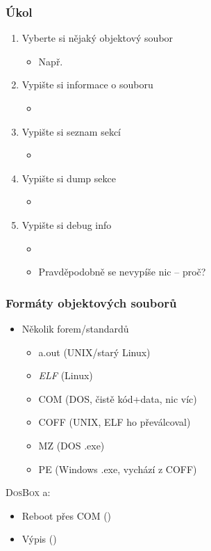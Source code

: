 \begin{frame}
  \frametitle{Úkol}

  \begin{enumerate}
    \item Vyberte si nějaký objektový soubor
    \begin{itemize}
      \item Např.\ 
    \end{itemize}
    \item Vypište si informace o souboru
    \begin{itemize}
      \item {}
    \end{itemize}
    \item Vypište si seznam sekcí
    \begin{itemize}
      \item {}
    \end{itemize}
    \item Vypište si dump sekce 
    \begin{itemize}
      \item {}
    \end{itemize}
    \item Vypište si debug info
    \begin{itemize}
      \item {}
      \item Pravděpodobně se nevypíše nic -- proč?
    \end{itemize}
  \end{enumerate}

\end{frame}

\begin{frame}
  \frametitle{Formáty objektových souborů}

  \begin{itemize}
    \item Několik forem/standardů
    \begin{itemize}
      \item a.out (UNIX/starý Linux)
      \item \emph{ELF} (Linux)
      \item COM (DOS, čistě kód+data, nic víc)
      \item COFF (UNIX, ELF ho převálcoval)
      \item MZ (DOS .exe)
      \item PE (Windows .exe, vychází z COFF)
    \end{itemize}
  \end{itemize}

  \pause

   \textsc{DosBox} a:
  \begin{itemize}
    \item Reboot přes COM ()
    \item Výpis ()
  \end{itemize}

\end{frame}

